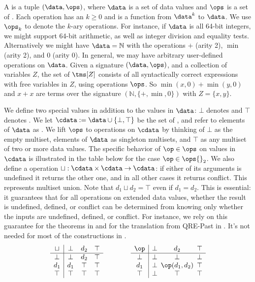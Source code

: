 A  is a tuple $(\data, \ops)$,
where $\data$ is a set of data values
and $\ops$ is a set of .
Each operation has an  $k \ge 0$
and is a function from $\data^k$ to $\data$.
We use $\ops_k$ to denote the $k$-ary operations.
For instance, if $\data$ is all 64-bit integers, we might support 64-bit arithmetic, as well as
integer division and equality tests.
Alternatively we might have $\data = \mathbb{N}$
with the operations $+$ (arity 2), $\min$ (arity 2), and $0$ (arity 0).
In general, we may have arbitrary user-defined operations on $\data$.
Given a signature $(\data, \ops)$,
and a collection of variables $Z$,
the set of  $\tms[Z]$
consists of all syntactically correct expressions
with free variables in $Z$, using operations $\ops$.
So $\min(x,0) + \min(y,0)$ and $x + x$
are terms over the signature $(\mathbb{N}, \{+,\min,0\})$ with $Z = \{x,y\}$.

We define two special values in addition to
the values in $\data$: $\bot$ denotes 
and $\top$ denotes .
We let $\cdata := \data \cup \{\bot, \top\}$ be the set of ,
and refer to elements of $\data$ as .
We lift $\ops$ to operations on $\cdata$ by thinking of $\bot$ as the empty multiset,
elements of $\data$ as singleton multisets, and $\top$ as any multiset of two or more data values.
The specific behavior of $\op \in \ops$ on values in $\cdata$
is illustrated in the table below
for the case $\op \in \ops{}_2$.
We also define a  operation $\sqcup: \cdata \times \cdata \to \cdata$:
if either of its arguments is undefined it returns the other one,
and in all other cases it returns conflict.
This represents multiset union. Note that $d_1 \sqcup d_2 = \top$ even if $d_1 = d_2$.
This is essential: it guarantees that for all operations on extended data values, whether the result is undefined, defined, or conflict can be determined from knowing only whether the inputs are undefined, defined, or conflict.
For instance, we rely on this guarantee for the theorems in
 and for the translation from QRE-Past in . It's not needed for most of the constructions in .
\[
\begin{array}{c|ccc}
\sqcup & \bot & d_2 & \top \\
\hline
\bot & \bot & d_2 & \top \\
d_1 & d_1 & \top & \top \\
\top & \top & \top & \top
\end{array}
\qquad \qquad
\begin{array}{c|ccc}
\op & \bot & d_2 & \top \\
\hline
\bot & \bot & \bot & \bot \\
d_1 & \bot & \hspace{-5pt}\op(d_1,d_2)\hspace{-5pt} & \top \\
\top & \bot & \top & \top
\end{array}
\]

